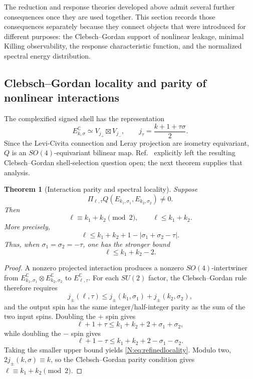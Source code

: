 \documentclass[
 aps,
 prd,
 reprint,
 amsmath,
 amssymb,
 nofootinbib,
 superscriptaddress
]{revtex4-2}
\newtheorem{theorem}{Theorem}[section]
\theoremstyle{definition}
\theoremstyle{remark}
\begin{document}
The reduction and response theories developed above admit several further
consequences once they are used together.  This section records those
consequences separately because they connect objects that were introduced
for different purposes: the Clebsch--Gordan support of nonlinear leakage,
minimal Killing observability, the response characteristic function, and the
normalized spectral energy distribution.

\subsection{Clebsch--Gordan locality and parity of nonlinear interactions}

The complexified signed shell has the representation
\begin{equation}
 E_{k,\sigma}^{\mathbb C}
 \simeq
 V_{j_+}\boxtimes V_{j_-},
 \qquad
 j_\tau=\frac{k+1+\tau\sigma}{2}.
 \label{N:eq:shellrep}
\end{equation}
Since the Levi-Civita connection and Leray projection are isometry
equivariant, \(Q\) is an \(SO(4)\)-equivariant bilinear map.  Ref.~\cite{BateninPreeceKB2026} explicitly left the resulting
Clebsch--Gordan shell-selection question open; the next theorem supplies
that analysis.

\begin{theorem}[Interaction parity and spectral locality]
\label{N:thm:selection}
Suppose
\[
 \Pi_{\ell,\tau}
 Q(E_{k_1,\sigma_1},E_{k_2,\sigma_2})
 \neq0.
\]
Then
\begin{equation}
 \boxed{
 \ell\equiv k_1+k_2\pmod 2,
 \qquad
 \ell\le k_1+k_2.
 }
 \label{N:eq:paritylocality}
\end{equation}
More precisely,
\begin{equation}
 \boxed{
 \ell
 \le
 k_1+k_2+1-
 \left|\sigma_1+\sigma_2-\tau\right|.
 }
 \label{N:eq:refinedlocality}
\end{equation}
Thus, when
\(\sigma_1=\sigma_2=-\tau\),
one has the stronger bound
\[
       \ell\le k_1+k_2-2.
\]
\end{theorem}

\begin{proof}
A nonzero projected interaction produces a nonzero
\(SO(4)\)-intertwiner from
\(E_{k_1,\sigma_1}^{\mathbb C}\otimes
 E_{k_2,\sigma_2}^{\mathbb C}\)
to \(E_{\ell,\tau}^{\mathbb C}\).
For each \(SU(2)\) factor, the Clebsch--Gordan rule therefore requires
\[
 j_\pm(\ell,\tau)
 \le
 j_\pm(k_1,\sigma_1)+j_\pm(k_2,\sigma_2),
\]
and the output spin has the same integer/half-integer parity as the sum of
the two input spins.  Doubling the \(+\) spin gives
\[
 \ell+1+\tau
 \le
 k_1+k_2+2+\sigma_1+\sigma_2,
\]
while doubling the \(-\) spin gives
\[
 \ell+1-\tau
 \le
 k_1+k_2+2-\sigma_1-\sigma_2.
\]
Taking the smaller upper bound yields
\eqref{N:eq:refinedlocality}.  Modulo two,
\(2j_\pm(k,\sigma)\equiv k\), so the Clebsch--Gordan parity condition gives
\(\ell\equiv k_1+k_2\pmod2\).
\end{proof}
\end{document}
